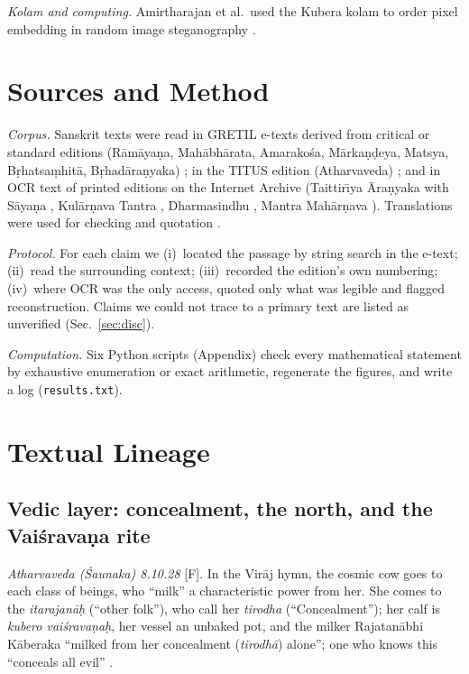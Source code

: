 \documentclass[journal]{IEEEtran}
\theoremstyle{definition}
\newcommand{\Fact}{\textsf{[F]}}
\begin{document}
\emph{Kolam and computing.} Amirtharajan et al.\ used the Kubera kolam to order pixel embedding in random image steganography \cite{amirtharajan2013}.

\section{Sources and Method}
\label{sec:method}
\emph{Corpus.} Sanskrit texts were read in GRETIL e-texts derived from critical or standard editions (R\=am\=aya\d na, Mah\=abh\=arata, Amarako\'sa, M\=arka\d n\d deya, Matsya, B\d rhatsa\d mhit\=a, B\d rhad\=ara\d nyaka) \cite{gretil_ramayana,gretil_mbh12,gretil_amara,gretil_mkp,gretil_matsya,gretil_bs,gretil_bau}; in the TITUS edition (Atharvaveda) \cite{titus_avs}; and in OCR text of printed editions on the Internet Archive (Taittir\=\i ya \=Ara\d nyaka with S\=aya\d na \cite{mitra1872ta}, Kul\=ar\d nava Tantra \cite{kularnava1917}, Dharmasindhu \cite{dharmasindhu1907}, Mantra Mah\=ar\d nava \cite{mantramaharnava}). Translations were used for checking and quotation \cite{roy_santi2,dutt1896mkp,mm1988trans,buhnemann2000,eggeling1900sbe44,agrippa1651}.

\emph{Protocol.} For each claim we (i)~located the passage by string search in the e-text; (ii)~read the surrounding context; (iii)~recorded the edition's own numbering; (iv)~where OCR was the only access, quoted only what was legible and flagged reconstruction. Claims we could not trace to a primary text are listed as unverified (Sec.~\ref{sec:disc}).

\emph{Computation.} Six Python scripts (Appendix) check every mathematical statement by exhaustive enumeration or exact arithmetic, regenerate the figures, and write a log (\texttt{results.txt}).

\section{Textual Lineage}
\label{sec:texts}

\subsection{Vedic layer: concealment, the north, and the Vai\'srava\d na rite}
\emph{Atharvaveda (\'Saunaka) 8.10.28} \Fact. In the Vir\=aj hymn, the cosmic cow goes to each class of beings, who ``milk'' a characteristic power from her. She comes to the \emph{itarajan\=a\d h} (``other folk''), who call her \emph{tirodha} (``Concealment''); her calf is \emph{kubero vai\'srava\d na\d h}, her vessel an unbaked pot, and the milker Rajatan\=abhi K\=aberaka ``milked from her concealment (\emph{tirodh\=a}) alone''; one who knows this ``conceals all evil'' \cite{titus_avs}.
\end{document}
